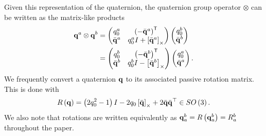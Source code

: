 Given this representation of the quaternion, the quaternion group operator
$\otimes$ can be written as the matrix-like products
\begin{align}
  \boldsymbol{\mathrm{q}}^a \otimes \boldsymbol{\mathrm{q}}^b &= \begin{pmatrix} q_0^a & \left(-\bar{\boldsymbol{\mathrm{q}}}^{a}\right)^{\mathsf{T}} \\ \bar{\boldsymbol{\mathrm{q}}}^a & q^a_0 I + \left[ \bar{\boldsymbol{\mathrm{q}}}^a \right]_{\times} \end{pmatrix}
	\begin{pmatrix} q_0^b \\ \bar{\boldsymbol{\mathrm{q}}}^b\end{pmatrix}
  \label{eq:quat_otimes_product1} \\
  &= \begin{pmatrix} q_0^b & \left(-\bar{\boldsymbol{\mathrm{q}}}^{b}\right)^{\mathsf{T}} \\ \bar{\boldsymbol{\mathrm{q}}}^b & q^b_0 I - \left[ \bar{\boldsymbol{\mathrm{q}}}^b \right]_{\times} \end{pmatrix}
	\begin{pmatrix} q_0^a \\ \bar{\boldsymbol{\mathrm{q}}}^a \end{pmatrix}.
  \label{eq:quat_otimes_product2}
\end{align}
We frequently convert a quaternion $\boldsymbol{\mathrm{q}}$ to its associated passive rotation
matrix. This is done with
\begin{equation}
R\left(\boldsymbol{\mathrm{q}}\right)=\left(2q_{0}^{2}-1\right)I-2q_{0}\left[ \bar{\boldsymbol{\mathrm{q}}} \right]_{\times}+2\bar{\boldsymbol{\mathrm{q}}}\bar{\boldsymbol{\mathrm{q}}}^{\top}\in SO\left(3\right).
\label{eq:est_paper_R_from_q}
\end{equation}
We also note that rotations are written equivalently as
$\boldsymbol{\mathrm{q}}_a^b=R\left(\boldsymbol{\mathrm{q}}_a^b\right)=R_a^b$ throughout the paper.

